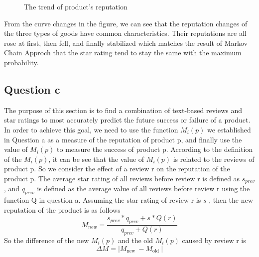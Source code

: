 \documentclass[12pt]{mcmthesis}
\begin{document}
\begin{itemize}
\begin{figure}[htbp]
	\quad
	
	\caption{The trend of product's reputation}
\end{figure}
\newpage
	From the curve changes in the figure, we can see that the reputation changes of the three types of goods have common characteristics. Their reputations are all rose at first, then fell, and finally stabilized which matches the result of Markov Chain Approch that the star rating tend to stay the same with the maximum probability.
\end{itemize}

\subsection{Question c}
The purpose of this section is to find a combination of text-based reviews and star ratings to most accurately predict the future success or failure of a product. In order to achieve this goal, we need to use the function $M_{i}(p)$ we established in Question a as a measure of the reputation of product p, and finally use the value of $M_{i}(p)$ to measure the success of product p. According to the definition of the $M_{i}(p)$, it can be see that the value of $M_{i}(p)$ is related to the reviews of product p. So we consider the effect of a review r on the reputation of the product p. The average star rating of all reviews before review r is defined as $s_{prev}$, and $q_{prev}$ is defined as the average value of all reviews before review r using the function Q in question a. Assuming the star rating of review r is $s$ , then the new reputation of the product is as follows$$M_{new}=\frac{s_{prev}*q_{prev}+s*Q(r)}{q_{prev}+Q(r)}$$
So the difference of the new $M_{i}(p)$ and the old $M_{i}(p)$ caused by review r is $$\Delta M=\left|M_{\text {new }}-M_{\text {old }}\right|$$
\end{document}
